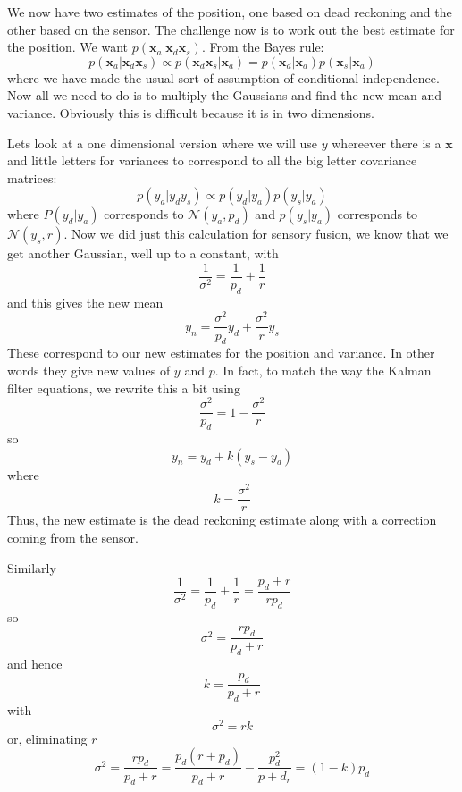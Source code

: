 \documentclass[12pt]{article}
\begin{document}
We now have two estimates of the position, one based on dead reckoning
and the other based on the sensor. The challenge now is to work out
the best estimate for the position. We want
$p(\mathbf{x}_a|\mathbf{x}_d\mathbf{x}_s)$. From the Bayes rule:
\begin{equation}
p(\mathbf{x}_a|\mathbf{x}_d\mathbf{x}_s)\propto p(\mathbf{x}_d\mathbf{x}_s|\mathbf{x}_a)=p(\mathbf{x}_d|\mathbf{x}_a)p(\mathbf{x}_s|\mathbf{x}_a)
\end{equation}
where we have made the usual sort of assumption of conditional
independence. Now all we need to do is to multiply the Gaussians and
find the new mean and variance. Obviously this is difficult because it
is in two dimensions. 

Lets look at a one dimensional version where we will use $y$ whereever
there is a $\mathbf{x}$ and little letters for variances to correspond
to all the big letter covariance matrices:
\begin{equation}
p(y_a|y_dy_s)\propto p(y_d|y_a)p(y_s|y_a)
\end{equation}
where $P(y_d|y_a)$ corresponds to $\mathcal{N}(y_a,p_d)$ and
$p(y_s|y_a)$ corresponds to $\mathcal{N}(y_s,r)$. Now we did just this calculation for sensory fusion, we know that we get another Gaussian, well up to a constant, with 
\begin{equation}
\frac{1}{\sigma^2}=\frac{1}{p_d}+\frac{1}{r}
\end{equation}
and this gives the new mean
\begin{equation}
y_n=\frac{\sigma^2}{p_d}y_d+\frac{\sigma^2}{r}y_s
\end{equation}
These correspond to our new estimates for the position and
variance. In other words they give new values of $y$ and $p$. In fact, to match the way the Kalman filter equations, we rewrite this a bit using
\begin{equation}
\frac{\sigma^2}{p_d}=1-\frac{\sigma^2}{r}
\end{equation}
so
\begin{equation}
y_n=y_d+k(y_s-y_d)
\end{equation}
where
\begin{equation}
k=\frac{\sigma^2}{r}
\end{equation}
Thus, the new estimate is the dead reckoning estimate along with a correction coming from the sensor. 

Similarly
\begin{equation}
\frac{1}{\sigma^2}=\frac{1}{p_d}+\frac{1}{r}=\frac{p_d+r}{rp_d}
\end{equation}
so 
\begin{equation}
\sigma^2=\frac{rp_d}{p_d+r}
\end{equation}
and hence
\begin{equation}
k=\frac{p_d}{p_d+r}
\end{equation}
with
\begin{equation}
\sigma^2=rk
\end{equation}
or, eliminating $r$
\begin{equation}
\sigma^2=\frac{rp_d}{p_d+r}=\frac{p_d(r+p_d)}{p_d+r}-\frac{p_d^2}{p+d_r}=(1-k)p_d
\end{equation}
\end{document}

